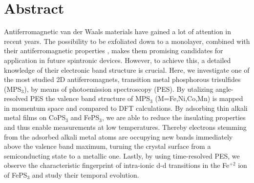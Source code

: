 \thispagestyle{plain}

\section*{Abstract}
    Antiferromagnetic van der Waals materials have gained a lot of attention in recent years.
    The possibility to be exfoliated down to a monolayer, combined with their antiferromagnetic properties
    , makes them promising candidates for application in future spintronic devices. 
    However, to achieve this, a detailed knowledge of their electronic band structure is crucial. Here, we investigate one of the most studied 2D antiferromagnets, transition metal phosphorous trisulfides (MPS$_\text{3}$), by means of photoemission spectroscopy (PES). 
    By utalizing angle-resolved PES the valence band structure of MPS$_\text{3}$ (M=Fe,Ni,Co,Mn) is mapped in momentum space and compared to DFT calculations.
    By adsorbing thin alkali metal films on CoPS$_\text{3}$ and FePS$_\text{3}$,
    we are able to reduce the insulating properties and thus enable measurements at low temperatures.
    Thereby electrons stemming from the adsorbed alkali metal atoms are occupying new bands immediately above the valence band maximum, turning the crystal surface from a semiconducting state to a metallic one.
    Lastly, by using time-resolved PES, we observe the characteristic fingerprint of intra-ionic d-d transitions in the Fe$^{+2}$ ion of FePS$_\text{3}$ and study their temporal evolution.
